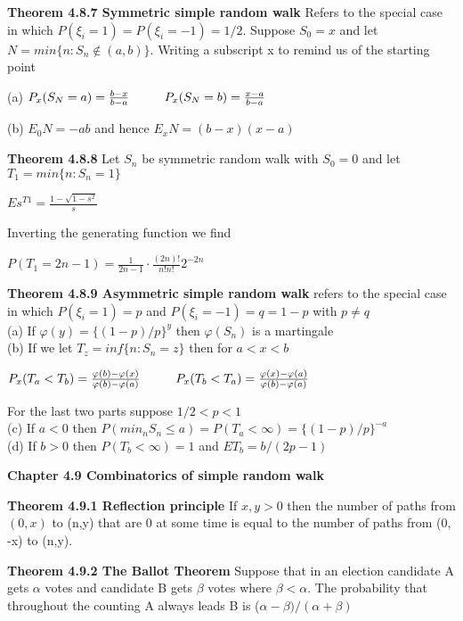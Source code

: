 \documentclass{article}
\newcommand\tab[1][1cm]{\hspace*{#1}}
\begin{document}
\textbf {Theorem 4.8.7 Symmetric simple random walk} Refers to the special case in which $P(\xi_i = 1) = P(\xi_i = -1) = 1/2$. Suppose $S_0 = x$ and let $N = min\{ n : S_n \notin (a,b)\}$. Writing a subscript x to remind us of the starting point
\begin{center}
(a) \tab $P_x (S_N = a) = \frac{b-x}{b-a} \tab P_x(S_N = b) = \frac{x-a}{b-a}$
\end{center}
(b) $E_0 N = -ab$ and hence $E_x N = (b-x) (x-a)$

\textbf {Theorem 4.8.8} Let $S_n$ be symmetric random walk with $S_0 = 0$ and let $T_1 = min \{ n : S_n = 1\}$
\begin{center}
$Es^{T1} = \frac{1 - \sqrt{1-s^2}}{s}$
\end{center}
Inverting the generating function we find
\begin{center}
$P(T_1 = 2n -1) = \frac{1}{2n-1} \cdot \frac{(2n)!}{n!n!} 2^{-2n}$
\end{center}

\textbf {Theorem 4.8.9 Asymmetric simple random walk} refers to the special case in which $P(\xi_i = 1) = p$ and $P(\xi_i = -1) = q = 1 - p$ with $p \neq q$ \\
(a) If $\varphi(y) = \{(1-p)/p\}^y$ then $\varphi(S_n)$ is a martingale \\
(b) If we let $T_z = inf\{n : S_n = z\} $ then for $a < x < b$
\begin{center}
$P_x(T_a < T_b) = \frac{\varphi(b) - \varphi(x)}{\varphi(b) -\varphi(a)} \tab P_x(T_b < T_a) = \frac{\varphi(x) - \varphi(a)}{\varphi(b)-\varphi(a)}$
\end{center}
For the last two parts suppose $1/2 < p < 1$ \\
(c) If $a < 0$ then $P(min_n S_n \leq a) = P(T_a < \infty) = \{(1-p)/p\}^{-a}$ \\
(d) If $b > 0$ then $P(T_b < \infty) = 1$ and $ET_b = b/(2p-1)$

\textbf {Chapter 4.9 Combinatorics of simple random walk}

\textbf {Theorem 4.9.1 Reflection principle} If $x, y > 0$ then the number of paths from $(0,x)$ to (n,y) that are 0 at some time is equal to the number of paths from (0, -x) to (n,y).

\textbf {Theorem 4.9.2 The Ballot Theorem} Suppose that in an election candidate A gets $\alpha$ votes and candidate B gets $\beta$ votes where $\beta < \alpha$. The probability that throughout the counting A always leads B is ($\alpha - \beta) / (\alpha + \beta)$
\end{document}
